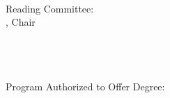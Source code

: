 \begin{titlepage}
    \begin{center}
        \large

        \hfill

        \vfill

        \begingroup
            \color{CTtitle}\spacedallcaps{\myTitle} \\ \bigskip
        \endgroup

        \spacedlowsmallcaps{\myName} \\ \bigskip \bigskip \bigskip \bigskip
        \bigskip \bigskip

        \mySubtitle \\ \medskip
        \myDegree \\ \medskip
        \myUni \\
        \myTime \\  \bigskip \bigskip \bigskip \bigskip
        \bigskip \bigskip

        Reading Committee: \\ \medskip
        \myChair, Chair \\ \medskip
        \myOtherOtherFaculty \\ \medskip
        \myFaculty \\  \medskip
        \myOtherFaculty \\ \bigskip \bigskip \bigskip \bigskip
        \bigskip \bigskip

        Program Authorized to Offer Degree: \\ \medskip
        \myDepartment \\

        \vfill

    \end{center}
\end{titlepage}
